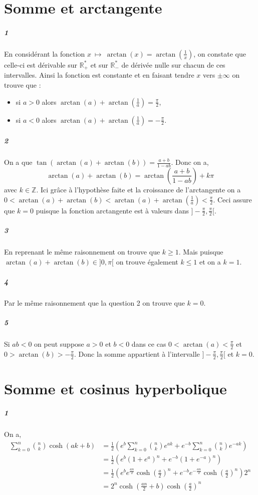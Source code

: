 \documentclass[10pt,a4paper]{article}
\begin{document}
\section{Somme et arctangente}
\subparagraph{1}En considérant la fonction $x \ \mapsto \ \arctan (x) = \arctan(\frac{1}{x})$, on constate que celle-ci est dérivable sur $\mathbb{R}_+^*$ et sur $\mathbb{R}_-^*$ de dérivée nulle sur chacun de ces intervalles. Ainsi la fonction est constante et en faisant tendre $x$ vers $\pm \infty$ on trouve que :
\begin{itemize}
\item si $a>0$ alors $\arctan(a) + \arctan(\frac{1}{a}) = \frac{\pi}{2}$,
\item si $a<0$ alors $\arctan(a) + \arctan(\frac{1}{a}) = -\frac{\pi}{2}$.
\end{itemize}

\subparagraph{2}On a que $\tan \left( \arctan(a) + \arctan(b) \right) = \frac{a+b}{1-ab}$. Donc on a,
\begin{equation}
\arctan(a) + \arctan(b) = \arctan \left( \frac{a+b}{1-ab}\right) + k\pi
\end{equation}
avec $k \in \mathbb{Z}$. 
Ici grâce à l'hypothèse faite et la croissance de l'arctangente on a $0<\arctan(a) + \arctan(b)<\arctan(a) + \arctan(\frac{1}{a}) < \frac{\pi}{2}$. Ceci assure que $k = 0$ puisque la fonction arctangente est à valeurs dans $]-\frac{\pi}{2},\frac{\pi}{2}[$.

\subparagraph{3}En reprenant le même raisonnement on trouve que $k\ge 1$. Mais puisque $\arctan(a)+\arctan(b) \in ]0,\pi[$ on trouve également $k\le 1$ et on a $k = 1$. 

\subparagraph{4}Par le même raisonnement que la question 2 on trouve que $k=0$.

\subparagraph{5}Si $ab<0$ on peut suppose $a>0$ et $b<0$ dans ce cas $0 <\arctan(a) < \frac{\pi}{2}$ et $0 >\arctan(b) > -\frac{\pi}{2}$. Donc la somme appartient à l'intervalle $]-\frac{\pi}{2},\frac{\pi}{2}[$ et $k=0$.
\section{Somme et cosinus hyperbolique}
\subparagraph{1}On a,
\begin{equation}
\begin{aligned}
\sum_{k=0}^n {n \choose k} \cosh(ak+b) &= \frac{1}{2} \left(e^b \sum_{k=0}^n {n \choose k} e^{ak} + e^{-b} \sum_{k=0}^n {n \choose k} e^{-ak} \right) \\
&= \frac{1}{2} \left( e^b(1+e^a)^n + e^{-b}(1+e^{-a})^n \right) \\
&= \frac{1}{2} \left( e^b e^{\frac{an}{2}}\cosh\left( \frac{a}{2} \right)^n + e^{-b} e^{-\frac{an}{2}}\cosh\left( \frac{a}{2} \right)^n\right)2^n \\
&= 2^n \cosh \left( \frac{an}{2}+b\right)\cosh\left( \frac{a}{2} \right)^n
\end{aligned}
\end{equation}
\end{document}
